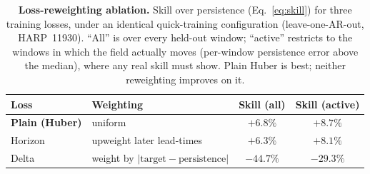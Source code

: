 \begin{table}[!htbp]
\centering
\small
\caption[Loss ablation]{\textbf{Loss-reweighting ablation.} Skill over
persistence (Eq.~\eqref{eq:skill}) for three training losses, under an identical
quick-training configuration (leave-one-AR-out, HARP~11930). ``All'' is over
every held-out window; ``active'' restricts to the windows in which the field
actually moves (per-window persistence error above the median), where any real
skill must show. Plain Huber is best; neither reweighting improves on it.}
\label{tab:ablation}
\renewcommand{\arraystretch}{1.2}
\begin{tabular}{|l|l|c|c|}
\hline
Loss & Weighting & Skill (all) & Skill (active) \\
\hline\hline
\textbf{Plain (Huber)} & uniform & $\mathbf{+6.8\%}$ & $\mathbf{+8.7\%}$ \\ \hline
Horizon & upweight later lead-times & $+6.3\%$ & $+8.1\%$ \\ \hline
Delta & weight by $|\text{target}-\text{persistence}|$ & $-44.7\%$ & $-29.3\%$ \\ \hline
\end{tabular}
\end{table}
